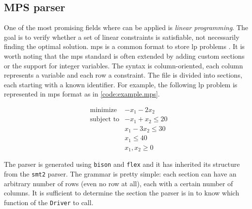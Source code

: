 



\subsection*{MPS parser}

One of the most promising fields where \dlinear can be applied is \textit{linear programming}.
The goal is to verify whether a set of linear constraints is satisfiable, not necessarily finding the optimal solution.
\gls{mps} is a common format to store \gls{lp} problems \cite{man:mps}.
It is worth noting that the \gls{mps} standard is often extended by adding custom sections or the support for integer variables.
The syntax is column-oriented, each column represents a variable and each row a constraint.
The file is divided into sections, each starting with a known identifier.
For example, the following \gls{lp} problem is represented in \gls{mps} format as in \autoref{code:example.mps}.

\begin{equation*}
        \begin{aligned}
                 & \text{minimize}   & - x_1 - 2 x_2       \\
                 & \text{subject to} & - x_1 + x_2 \leq 20 \\
                 &                   & x_1 - 3 x_2 \leq 30 \\
                 &                   & x_1 \leq 40         \\
                 &                   & x_1, x_2 \geq 0
        \end{aligned}
\end{equation*}



The parser is generated using \texttt{bison} and \texttt{flex} and it has inherited its structure from the \texttt{smt2} parser.
The grammar is pretty simple: each section can have an arbitrary number of rows (even no row at all), each with a certain number of columns.
It is sufficient to determine the section the parser is in to know which function of the \texttt{Driver} to call.


